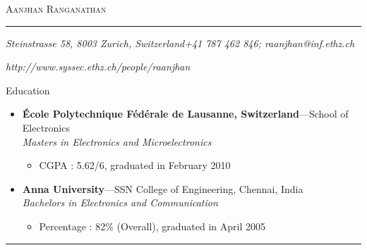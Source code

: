 \documentclass[11pt,oneside]{article}
\makeatletter
\newcommand{\name}{Aanjhan Ranganathan}
\newcommand{\addr}{Steinstrasse 58, 8003 Zurich, Switzerland}
\newcommand{\phone}{+41 787 462 846}
\newcommand{\email}{raanjhan@inf.ethz.ch}
\newcommand{\webaddr}{http://www.syssec.ethz.ch/people/raanjhan}
\newcommand{\bigname}[1]{
	\begin{center}\fontfamily{phv}\selectfont\Huge\scshape#1\end{center}
}
\newenvironment{ressection}[1]{
	\vspace{4pt}
	{\fontfamily{phv}\selectfont\Large#1}
	\begin{itemize}
	\vspace{3pt}
}{
	\end{itemize}
}
\newcommand{\ressubitem}[1]{
	\vspace{-1pt}
	\item \begin{flushleft} #1 \end{flushleft}
}
\newcommand{\resbigitem}[3]{
	\vspace{-5pt}
	\item
	\textbf{#1}---#2 \\
	\textit{#3}
}
\newenvironment{ressubsec}[3]{
	\resbigitem{#1}{#2}{#3}
	\vspace{-2pt}
	\begin{itemize}
}{
	\end{itemize}
}
\makeatother
\begin{document}
 \selectfont

\bigname{\name}

\vspace{-8pt} \rule{\textwidth}{1pt}

\vspace{-1pt} {\small\itshape \addr \hfill \phone; \email}

\vspace{-1pt} {\small\itshape \hfill \webaddr}

\vspace{8 pt}




\begin{ressection}{Education}
    \begin{ressubsec}{\'{E}cole Polytechnique F\'{e}d\'{e}rale de Lausanne, Switzerland}{School of Electronics}{Masters in Electronics and Microelectronics}
		\ressubitem{CGPA : 5.62/6, graduated in February 2010}
	\end{ressubsec}
	\begin{ressubsec}{Anna University}{SSN College of Engineering, Chennai, India}{Bachelors in Electronics and Communication}
		\ressubitem{Percentage : 82\% (Overall), graduated in April 2005 }
	\end{ressubsec}
\end{ressection}
\rule{\textwidth}{.5pt}
\end{document}
